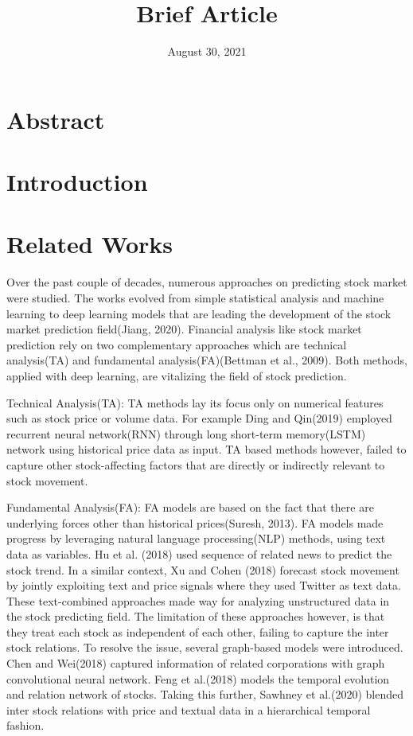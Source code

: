 \documentclass[11pt, oneside, twocolumn]{article}   	%
\title{Brief Article}
\author{}
\date{August 30, 2021}							%
\begin{document}
\maketitle

\section{Abstract}
\section{Introduction}
\section{Related Works}
Over the past couple of decades, numerous approaches on predicting stock market were studied. The works evolved from simple statistical analysis and machine learning to deep learning models that are leading the development of the stock market prediction field(Jiang, 2020). Financial analysis like stock market prediction rely on two complementary approaches which are technical analysis(TA) and fundamental analysis(FA)(Bettman et al., 2009). Both methods, applied with deep learning, are vitalizing the field of stock prediction.

Technical Analysis(TA): TA methods lay its focus only on numerical features such as stock price or volume data. For example Ding and Qin(2019) employed recurrent neural network(RNN) through long short-term memory(LSTM) network using historical price data as input. TA based methods however, failed to capture other stock-affecting factors that are directly or indirectly relevant to stock movement. 

Fundamental Analysis(FA): FA models are based on the fact that there are underlying forces other than historical prices(Suresh, 2013). FA models made progress by leveraging natural language processing(NLP) methods, using text data as variables. Hu et al. (2018) used sequence of related news to predict the stock trend. In a similar context, Xu and Cohen (2018) forecast stock movement by jointly exploiting text and price signals where they used Twitter as text data. These text-combined approaches made way for analyzing unstructured data in the stock predicting field. The limitation of these approaches however, is that they treat each stock as independent of each other, failing to capture the inter stock relations. To resolve the issue, several graph-based models were introduced. Chen and Wei(2018) captured information of related corporations with graph convolutional neural network. Feng et al.(2018) models the temporal evolution and relation network of stocks. Taking this further, Sawhney et al.(2020) blended inter stock relations with price and textual data in a hierarchical temporal fashion.
\end{document}
